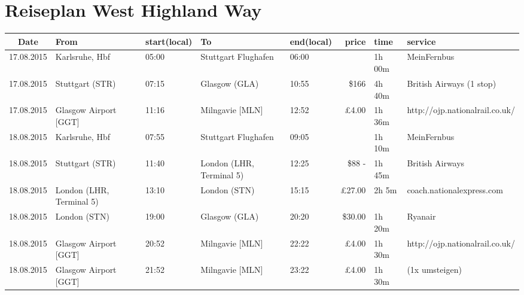 \documentclass[a4paper, landscape]{scrartcl}
\begin{document}
\clearpage
\section*{Reiseplan West Highland Way}
\vspace*{\fill}
    \begin{table}[ht]
        \centering
        \begin{tabular}{cl p{2cm} l p{2cm} rl p{5cm}}
        \toprule
    \textbf{Date}  & \textbf{From}              & \textbf{start\newline (local)} & \textbf{To} & \textbf{end\newline (local)} & \textbf{price} & \textbf{time} & \textbf{service} \\ \midrule
    17.08.2015 & Karlsruhe, Hbf           & 05:00          & Stuttgart Flughafen      & 06:00        & \EUR 8.50      & 1h 00m & MeinFernbus      \\
    17.08.2015 & Stuttgart (STR)          & 07:15          & Glasgow (GLA)            & 10:55        & \$166          & 4h 40m & British Airways (1 stop) \\
    17.08.2015 & Glasgow Airport [GGT]    & 11:16          & Milngavie [MLN]          & 12:52        &    £4.00       & 1h 36m & http://ojp.nationalrail.co.uk/      \\
    \midrule
    18.08.2015 & Karlsruhe, Hbf           & 07:55          & Stuttgart Flughafen      & 09:05        & \EUR 5.00      & 1h 10m & MeinFernbus      \\
    18.08.2015 & Stuttgart (STR)          & 11:40          & London (LHR, Terminal 5) & 12:25        & \$88 - \EUR 100.00 & 1h 45m & British Airways \\
    18.08.2015 & London (LHR, Terminal 5) & 13:10          & London (STN)             & 15:15        &   £27.00       & 2h 5m  & coach.nationalexpress.com           \\
    18.08.2015 & London (STN)             & 19:00          & Glasgow (GLA)            & 20:20        &  \$30.00       & 1h 20m & Ryanair                             \\
    18.08.2015 & Glasgow Airport [GGT]    & 20:52          & Milngavie [MLN]          & 22:22        &    £4.00       & 1h 30m & http://ojp.nationalrail.co.uk/      \\
    18.08.2015 & Glasgow Airport [GGT]    & 21:52          & Milngavie [MLN]          & 23:22        &    £4.00       & 1h 30m & (1x umsteigen)                      \\\midrule\midrule

\end{tabular}
\end{table}
\end{document}
